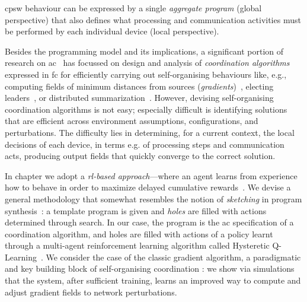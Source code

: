 \begin{comment}
In this work,
 we consider \emph{\ac{ac}}~\cite{DBLP:journals/computer/BealPV15}, a prominent \emph{field-based coordination} approach~\cite{DBLP:journals/jlap/ViroliBDACP19} 
promoting macro-programming 
 by capturing \ac{cas} behaviours 
 as functions operating on \emph{computational fields}~\cite{DBLP:journals/jlap/ViroliBDACP19},
 in a system model of neighbour-interacting devices
 operating in asynchronous sense-compute-interact rounds.
%
A computational field is a macro-abstraction
 that maps a set of devices over time to computational values.
%
\ac{ac} is based on the \emph{\ac{fc}}~\cite{DBLP:journals/jlap/ViroliBDACP19}, or variants thereof,
 that define constructs for manipulating and evolving fields.
%
\end{comment}
\ac{cpsw} behaviour
 can be expressed by a single \emph{aggregate program} (global perspective)
 that also defines 
 what processing and communication activities
 must be performed by each individual device (local perspective).

Besides the programming model and its implications,
 a significant portion of research on \ac{ac}~\cite{DBLP:journals/jlap/ViroliBDACP19} has focussed
 on design and analysis of \emph{coordination algorithms} expressed in \ac{fc}
 for efficiently carrying out self-organising behaviours
 like, e.g., computing fields of minimum distances from sources (\emph{gradients})~\cite{DBLP:conf/ipsn/NagpalSB03,DBLP:journals/pervasive/MameiZL04,DBLP:conf/saso/AudritoCDV17},
 electing leaders~\cite{DBLP:conf/saso/MoBD18},
 or %
 distributed summarization~\cite{DBLP:journals/cee/AudritoCDPV21}.
%
However, devising self-organising coordination algorithms is not easy; especially difficult is identifying solutions
 that are efficient across environment assumptions, configurations, and perturbations.
%
The difficulty lies in determining, 
 for a current context,
 the local decisions of each device, 
 in terms e.g. of processing steps and communication acts,
 producing output fields that quickly converge to the correct solution.

In chapter we adopt a \emph{\ac{rl}-based approach}---where an agent learns from experience
 how to behave in order to maximize delayed cumulative rewards~\cite{sutton2018reinforcement-learning}.
%
We devise a general methodology that somewhat resembles the notion of \emph{sketching} in program synthesis~\cite{solar2008program-synthesis-sketching}:
 a template program is given and \emph{holes} are filled with actions determined through search.
%
In our case, the program is the \ac{ac} specification of a coordination algorithm, and holes are filled with actions of a policy learnt through a multi-agent reinforcement learning algorithm called Hysteretic Q-Learning~\cite{DBLP:conf/iros/MatignonLF07}.
%
We consider the case of the classic gradient algorithm, a paradigmatic and key building block of self-organising coordination \cite{DBLP:journals/jlap/ViroliBDACP19,beal2013organizing-aggregate,DBLP:journals/corr/abs-2201-03473}: we show via simulations 
 that the system, after sufficient training,
 learns an improved way to compute and adjust gradient fields to network perturbations.

